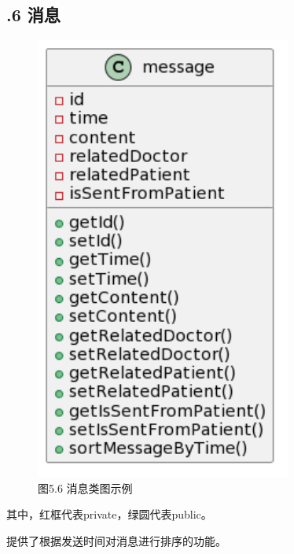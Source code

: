 \documentclass[24pt,a4paper]{article}%
\begin{document}
\subsection*{.6 消息}
\begin{figure}[H]
    \centering
    \includegraphics[width=0.75\textwidth]{images/message.png}
    \caption*{图5.6 消息类图示例}
\end{figure}
其中，红框代表private，绿圆代表public。\par
提供了根据发送时间对消息进行排序的功能。
\end{document}

